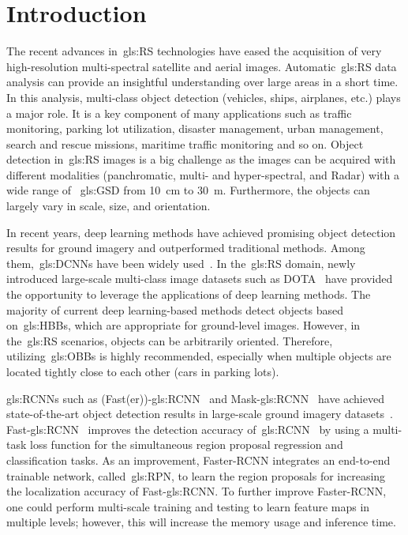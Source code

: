 \documentclass[runningheads]{llncs}
\begin{document}
\section{Introduction}
The recent advances in~\gls{gls:RS} technologies have eased the acquisition of very high-resolution multi-spectral satellite and aerial images.
Automatic~\gls{gls:RS} data analysis can provide an insightful understanding over large areas in a short time.
In this analysis, multi-class object detection (\eg vehicles, ships, airplanes, etc.) plays a major role.
It is a key component of many applications such as traffic monitoring, parking lot utilization, disaster management, urban management, search and rescue missions, maritime traffic monitoring and so on. 
    Object detection in~\gls{gls:RS} images is a big challenge as the images can be acquired with different modalities (\eg panchromatic, multi- and hyper-spectral, and Radar) with a wide range of ~\gls{gls:GSD} \eg from \SI{10}{\cm} to \SI{30}{\m}.
    Furthermore, the objects can largely vary in scale, size, and orientation.
    
     In recent years, deep learning methods have achieved promising object detection results for ground imagery and outperformed traditional methods.
 Among them,~\glspl{gls:DCNN} have been widely used~\cite{alexnet,Simonyan2015VeryRecognition,resnetHe15}.
In the~\gls{gls:RS} domain, newly introduced large-scale multi-class image datasets such as DOTA~\cite{dota} have provided the opportunity to leverage the applications of deep learning methods.	
The majority of current deep learning-based methods detect objects based on~\glspl{gls:HBB}, which are appropriate for ground-level images.
However, in the~\gls{gls:RS} scenarios, objects can be arbitrarily oriented.
Therefore, utilizing~\glspl{gls:OBB} is highly recommended, especially when multiple objects are located tightly close to each other (\eg cars in parking lots).

    \glspl{gls:RCNN} such as (Fast(er))-\gls{gls:RCNN}~\cite{rcnn, fasterrcnnNIPS2015,fastrcnn} and Mask-\gls{gls:RCNN}~\cite{he2017maskrcnn} have achieved state-of-the-art object detection results in large-scale ground imagery datasets~\cite{Everingham10thepascal,Lin2014}.
 Fast-\gls{gls:RCNN}~\cite{fastrcnn} improves the detection accuracy of~\gls{gls:RCNN}~\cite{rcnn} by using a multi-task loss function for the simultaneous region proposal regression and classification tasks.
 As an improvement, Faster-RCNN integrates an end-to-end trainable network, called~\gls{gls:RPN}, to learn the region proposals for increasing the localization accuracy of Fast-\gls{gls:RCNN}.
 To further improve Faster-RCNN, one could perform multi-scale training and testing to learn feature maps in multiple levels; however, this will increase the memory usage and inference time.
 
\end{document}
